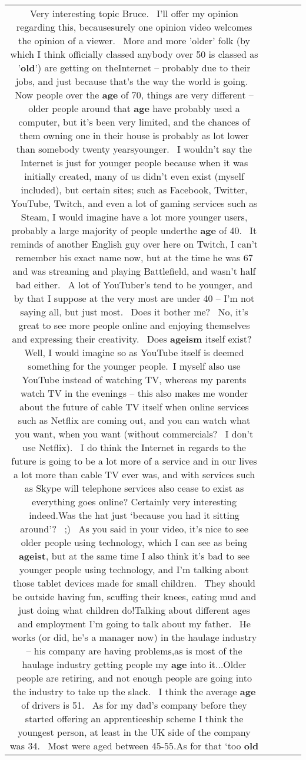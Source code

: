 \documentclass[11pt]{article}
\newlength\mylength
\begin{document}
\begin{center}
\begin{longtable}{|C{.65\mylength}|C{.30\mylength}|C{.12\mylength}|C{.12\mylength}|C{.12\mylength}|}
  \small Very interesting topic Bruce.  I'll offer my opinion regarding this, becausesurely one opinion video welcomes the opinion of a viewer.  More and more 'older' folk (by which I think officially classed anybody over 50 is classed as '\textbf{old}') are getting on theInternet – probably due to their jobs, and just because that's the way the world is going.  Now people over the \textbf{age} of 70, things are very different – older people around that \textbf{age} have probably used a computer, but it's been very limited, and the chances of them owning one in their house is probably as lot lower than somebody twenty yearsyounger.  I wouldn't say the Internet is just for younger people because when it was initially created, many of us didn't even exist (myself included), but certain sites; such as Facebook, Twitter, YouTube, Twitch, and even a lot of gaming services such as Steam, I would imagine have a lot more younger users, probably a large majority of people underthe \textbf{age} of 40.  It reminds of another English guy over here on Twitch, I can't remember his exact name now, but at the time he was 67 and was streaming and playing Battlefield, and wasn't half bad either.  A lot of YouTuber's tend to be younger, and by that I suppose at the very most are under 40 – I'm not saying all, but just most.  Does it bother me?  No, it's great to see more people online and enjoying themselves and expressing their creativity.  Does \textbf{ageism} itself exist?  Well, I would imagine so as YouTube itself is deemed something for the younger people. I myself also use YouTube instead of watching TV, whereas my parents watch TV in the evenings – this also makes me wonder about the future of cable TV itself when online services such as Netflix are coming out, and you can watch what you want, when you want (without commercials?  I don't use Netflix).  I do think the Internet in regards to the future is going to be a lot more of a service and in our lives a lot more than cable TV ever was, and with services such as Skype will telephone services also cease to exist as  everything goes online? Certainly very interesting indeed.Was the hat just ‘because you had it sitting around'?  ;)  As you said in your video, it's nice to see older people using technology, which I can see as being \textbf{ageist}, but at the same time I also think it's bad to see younger people using technology, and I'm talking about those tablet devices made for small children.  They should be outside having fun, scuffing their knees, eating mud and just doing what children do!Talking about different ages and employment I'm going to talk about my father.  He works (or did, he's a manager now) in the haulage industry – his company are having problems,as is most of the haulage industry getting people my \textbf{age} into it...Older people are retiring, and not enough people are going into the industry to take up the slack.  I think the average \textbf{age} of drivers is 51.  As for my dad's company before they started offering an apprenticeship scheme I think the youngest person, at least in the UK side of the company was 34.  Most were aged between 45-55.As for that ‘too \textbf{old} 
\end{longtable}
\end{center}
\end{document}
